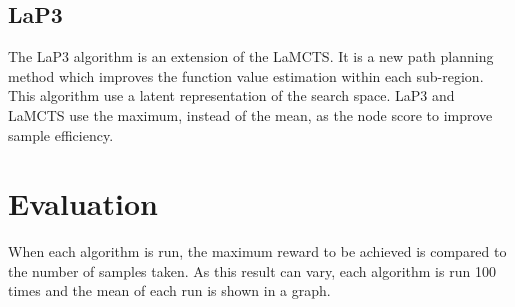 \documentclass[bibliography=totoc]{scrartcl}
\begin{document}
\subsection{LaP3}

The \ac{LaP3} algorithm is an extension of the LaMCTS. \cite{NEURIPS2021_03a3655f}
It is a new path planning method which improves the function value estimation within each sub-region.
This algorithm use a latent representation of the search space.
\ac{LaP3} and \ac{LaMCTS} use the maximum, instead of the mean, as the node score to improve sample efficiency.

\section{Evaluation}



When each algorithm is run, the maximum reward to be achieved is compared to the number of samples taken. As this result can vary, each algorithm is run 100 times and the mean of each run is shown in a graph.
\end{document}
